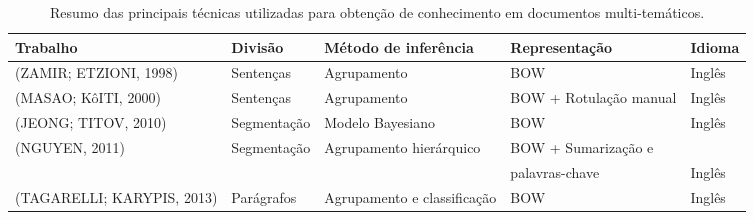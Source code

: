 


















































\begin{table}[!h]
	\centering \tiny 
	\begin{tabular}{|l|l|l|l|l|} \hline
		\textbf{Trabalho} & \textbf{Divisão} & \textbf{Método de inferência}  & \textbf{Representação} & \textbf{Idioma}\\
		\hline\hline 
	
	 (ZAMIR; ETZIONI, 1998) &      	Sentenças  & Agrupamento                 & BOW & Inglês \\ \hline
	 (MASAO; KôITI, 2000) &        	Sentenças  & Agrupamento                 & BOW + Rotulação  manual & Inglês \\ \hline
	 (JEONG; TITOV, 2010) &        	Segmentação   & Modelo Bayesiano            & BOW & Inglês \\ \hline
	 (NGUYEN, 2011) &              	Segmentação  & Agrupamento hierárquico     & BOW + Sumarização e & \\ &&&palavras-chave& Inglês  \\ \hline
	 (TAGARELLI; KARYPIS, 2013) &  	Parágrafos & Agrupamento e classificação & BOW & Inglês \\ \hline

	\end{tabular}
	\caption{Resumo das principais técnicas utilizadas para obtenção de conhecimento em documentos multi-temáticos.}
	\label{tab:resumo-trabalhos}

\end{table}





